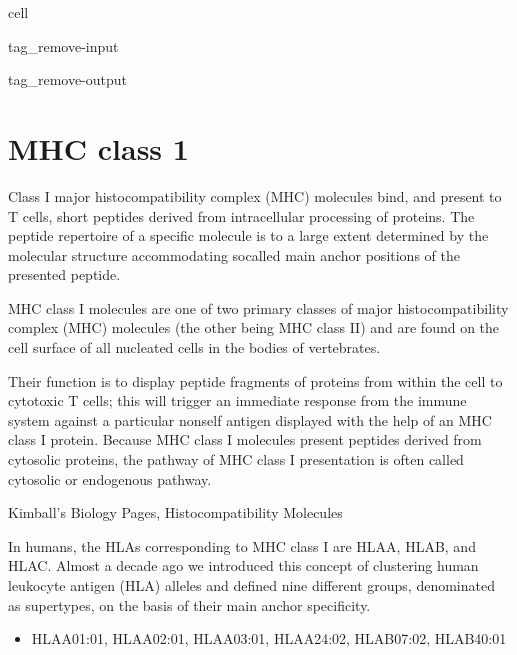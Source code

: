\documentclass[letterpaper,10pt,english]{jupyterBook}
\begin{document}
\begin{sphinxuseclass}{cell}
\begin{sphinxuseclass}{tag_remove-input}
\begin{sphinxuseclass}{tag_remove-output}
\end{sphinxuseclass}
\end{sphinxuseclass}
\end{sphinxuseclass}

\section{MHC class 1}
\label{\detokenize{ipynb/chapter4:mhc-class-1}}
\sphinxAtStartPar
Class I major histocompatibility complex (MHC) molecules bind, and present to T cells, short peptides derived from intracellular processing of proteins. The peptide repertoire of a specific molecule is to a large extent determined by the molecular structure accommodating so\sphinxhyphen{}called main anchor positions of the presented peptide.

\sphinxAtStartPar
MHC class I molecules are one of two primary classes of major histocompatibility complex (MHC) molecules (the other being MHC class II) and are found on the cell surface of all nucleated cells in the bodies of vertebrates.

\sphinxAtStartPar
Their function is to display peptide fragments of proteins from within the cell to cytotoxic T cells; this will trigger an immediate response from the immune system against a particular non\sphinxhyphen{}self antigen displayed with the help of an MHC class I protein. Because MHC class I molecules present peptides derived from cytosolic proteins, the pathway of MHC class I presentation is often called cytosolic or endogenous pathway.%
\begin{footnote}[1]\sphinxAtStartFootnote
Kimball’s Biology Pages, Histocompatibility Molecules
%
\end{footnote}

\sphinxAtStartPar
In humans, the HLAs corresponding to MHC class I are HLA\sphinxhyphen{}A, HLA\sphinxhyphen{}B, and HLA\sphinxhyphen{}C. Almost a decade ago we introduced this concept of clustering human leukocyte antigen (HLA) alleles and defined nine different groups, denominated as supertypes, on the basis of their main anchor specificity.
\begin{itemize}
\item {} 
\sphinxAtStartPar
HLA\sphinxhyphen{}A01:01, HLA\sphinxhyphen{}A02:01, HLA\sphinxhyphen{}A03:01, HLA\sphinxhyphen{}A24:02, HLA\sphinxhyphen{}B07:02, HLA\sphinxhyphen{}B40:01

\end{itemize}
\end{document}
